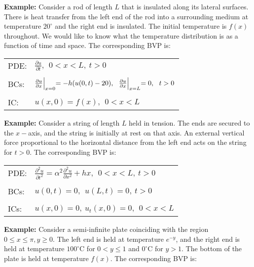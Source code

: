 \vspace{0.15cm}

\noindent\textbf{Example: } Consider a rod of length $L$ that is insulated along its lateral surfaces.  There is heat transfer from the left end of the rod into a surrounding medium at temperature $20^{\circ}$ and the right end is insulated.  The initial temperature is $f(x)$ throughout.  We would like to know what the temperature distribution is as a function of time and space.  The corresponding BVP is:
\begin{table}
\begin{tabular}{l l}
PDE: & $\frac{\partial u}{\partial t}, \ \ 0<x<L, \ t>0 $ \\
& \\
BCs: & $\frac{\partial u}{\partial x}\Bigl|_{x=0} = -h(u(0,t)-20), \ \  \frac{\partial u}{\partial x}\Bigl|_{x=L} = 0, \ \ t>0$ \\
& \\
IC: & $u(x,0) = f(x), \ \ 0<x<L$ \\
\end{tabular}
\end{table}

\vspace{0.25cm}

\noindent\textbf{Example: } Consider a string of length $L$ held in tension.  The ends are secured to the $x-$axis, and the string is initially at rest on that axis.  An external vertical force proportional to the horizontal distance from the left end acts on the string for $t>0$.  The corresponding BVP is:
\begin{table}
\begin{tabular}{l l}
PDE: & $\frac{\partial^2 u}{\partial t^2} = \alpha^2 \frac{\partial^2 u}{\partial x^2} + hx, \ \ 0<x<L, \ t>0 $ \\
& \\
BCs: & $u(0,t)=0, \ \ u(L,t) = 0, \ t>0 $ \\
& \\
ICs: & $u(x,0) = 0, \ u_t(x,0) = 0, \ \ 0<x<L$ \\
\end{tabular}
\end{table}

\vspace{0.25cm}

\noindent\textbf{Example: } Consider a semi-infinite plate coinciding with the region $0 \le x \le \pi, y\ge 0.$  The left end is held at temperature $e^{-y}$, and the right end is held at temperature $100^{\circ}$C for $0 < y \le 1$ and $0^{\circ}$C for $y>1$.  The bottom of the plate is held at temperature $f(x)$.  The corresponding BVP is:

